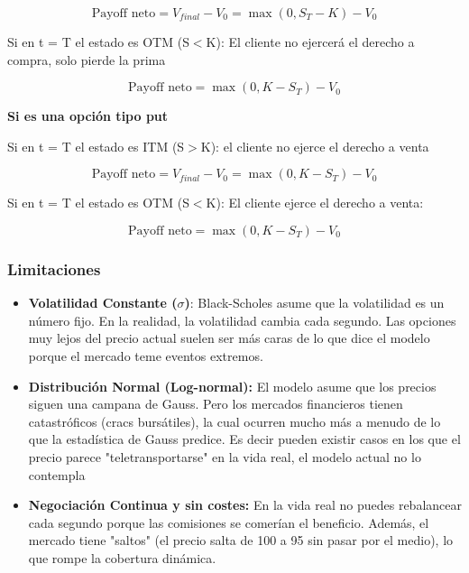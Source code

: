 \documentclass[11pt]{article}
\newcommand{\comillas}[1]{"#1"} %
\begin{document}
				\begin{equation}
					\text{Payoff neto} = V_{final} - V_0 = \max(0,S_T - K) - V_0
				\end{equation}
			
				Si en t = T el estado es OTM (S$<$K): El cliente no ejercerá el derecho a compra, solo pierde la prima
			
				\begin{equation}
					\text{Payoff neto} = \max(0,K - S_T) - V_0
				\end{equation}
			
				\textbf{Si es una opción tipo put}
			
				Si en t = T el estado es ITM (S$>$K): el cliente no ejerce el derecho a venta
			
				\begin{equation}
					\text{Payoff neto} = V_{final} - V_0 = \max(0,K - S_T) - V_0
				\end{equation}
			
				Si en t = T el estado es OTM (S$<$K): El cliente ejerce el derecho a venta:
			
				\begin{equation}
					\text{Payoff neto} = \max(0,K - S_T) - V_0
				\end{equation}
				
				\subsubsection{Limitaciones}
				\begin{itemize}
					\item \textbf{Volatilidad Constante ($\sigma$)}: Black-Scholes asume que la volatilidad es un número fijo. En la realidad, la volatilidad cambia cada segundo. Las opciones muy lejos del precio actual suelen ser más caras de lo que dice el modelo porque el mercado teme eventos extremos.
					
					\item \textbf{Distribución Normal (Log-normal):} El modelo asume que los precios siguen una campana de Gauss. Pero los mercados financieros tienen catastróficos (cracs bursátiles), la cual ocurren mucho más a menudo de lo que la estadística de Gauss predice. Es decir pueden existir casos en los que el precio parece \comillas{teletransportarse} en la vida real, el modelo actual no lo contempla
					
					\item \textbf{Negociación Continua y sin costes:} En la vida real no puedes rebalancear cada segundo porque las comisiones se comerían el beneficio. Además, el mercado tiene \comillas{saltos} (el precio salta de 100 a 95 sin pasar por el medio), lo que rompe la cobertura dinámica.
				\end{itemize}
		
\end{document}
